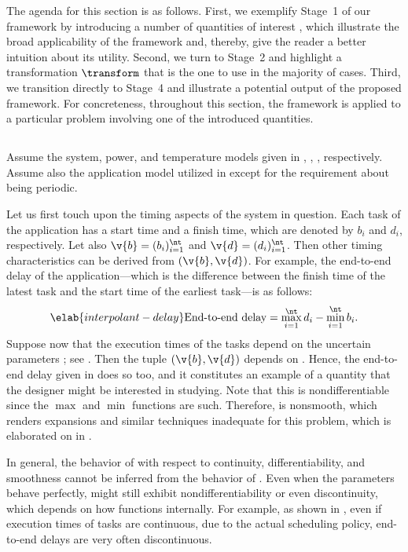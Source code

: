 The agenda for this section is as follows. First, we exemplify Stage~1 of our
framework by introducing a number of quantities of interest \g, which illustrate
the broad applicability of the framework and, thereby, give the reader a better
intuition about its utility. Second, we turn to Stage~2 and highlight a
transformation $\transform$ that is the one to use in the majority of cases.
Third, we transition directly to Stage~4 and illustrate a potential output of
the proposed framework. For concreteness, throughout this section, the framework
is applied to a particular problem involving one of the introduced quantities.

\subsection{\problemtitle}

Assume the system, power, and temperature models given in ,
, , respectively. Assume also the
application model utilized in  except for the
requirement about being periodic.

Let us first touch upon the timing aspects of the system in question. Each task
of the application has a start time and a finish time, which are denoted by
$b_i$ and $d_i$, respectively. Let also $\v{b} = (b_i)_{i = 1}^\nt$ and $\v{d} =
(d_i)_{i = 1}^\nt$. Then other timing characteristics can be derived from
$(\v{b}, \v{d})$. For example, the end-to-end delay of the application---which
is the difference between the finish time of the latest task and the start time
of the earliest task---is as follows:
\begin{equation} \elab{interpolant-delay}
  \text{End-to-end delay}
  = \max_{i = 1}^\nt d_i - \min_{i = 1}^\nt b_i.
\end{equation}
Suppose now that the execution times of the tasks depend on the uncertain
parameters \vu; see . Then the tuple $(\v{b}, \v{d})$
depends on \vu. Hence, the end-to-end delay given in 
does so too, and it constitutes an example of a quantity \g that the designer
might be interested in studying. Note that this \g is nondifferentiable since
the $\max$ and $\min$ functions are such. Therefore, \g is nonsmooth, which
renders  expansions and similar techniques inadequate for this problem,
which is elaborated on in .

\begin{remark} 
In general, the behavior of \g with respect to continuity, differentiability,
and smoothness cannot be inferred from the behavior of \vu. Even when the
parameters behave perfectly, \g might still exhibit nondifferentiability or even
discontinuity, which depends on how \g functions internally. For example, as
shown in \cite{tanasa2015}, even if execution times of tasks are continuous, due
to the actual scheduling policy, end-to-end delays are very often discontinuous.
\end{remark}

